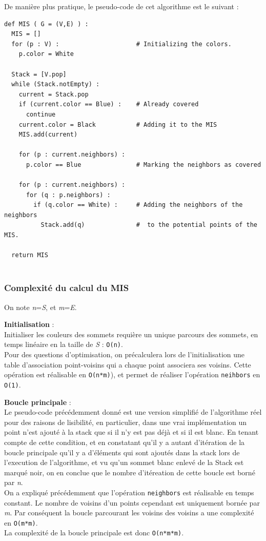 \documentclass[]{report}
\begin{document}
De manière plus pratique, le pseudo-code de cet algorithme est le
suivant :

\begin{lstlisting}
def MIS ( G = (V,E) ) :
  MIS = []
  for (p : V) :                     # Initializing the colors.
    p.color = White
  
  Stack = [V.pop]
  while (Stack.notEmpty) :
    current = Stack.pop
    if (current.color == Blue) :    # Already covered
      continue
    current.color = Black           # Adding it to the MIS
    MIS.add(current)
    
    for (p : current.neighbors) :
      p.color == Blue               # Marking the neighbors as covered
  
    for (p : current.neighbors) :
      for (q : p.neighbors) :
        if (q.color == White) :     # Adding the neighbors of the neighbors
          Stack.add(q)              #  to the potential points of the MIS.

  return MIS
  
\end{lstlisting}

\subsubsection{Complexité du calcul du
MIS}\label{complexituxe9-du-calcul-du-mis}

On note \emph{n}=\textbar{}\emph{S}\textbar{}, et
\emph{m}=\textbar{}\emph{E}\textbar{}.

\textbf{Initialisation} :\\
Initialiser les couleurs des sommets requière un unique parcours des
sommets, en temps linéaire en la taille de \emph{S} :
\lstinline!O(n)!.\\
Pour des questions d'optimisation, on précalculera lors de
l'initialisation une table d'association point-voisins qui a chaque
point associera ses voisins. Cette opération est réalisable en
\lstinline!O(n*m)!), et permet de réaliser l'opération
\lstinline!neihbors! en \lstinline!O(1)!.

\textbf{Boucle principale} :\\
Le pseudo-code précédemment donné est une version simplifié de
l'algorithme réel pour des raisons de lisibilité, en particulier, dans
une vrai implémentation un point n'est ajouté à la stack que si il n'y
est pas déjà et si il est blanc. En tenant compte de cette condition, et
en constatant qu'il y a autant d'itération de la boucle principale qu'il
y a d'éléments qui sont ajoutés dans la stack lors de l'execution de
l'algorithme, et vu qu'un sommet blanc enlevé de la Stack est marqué
noir, on en conclue que le nombre d'itéreation de cette boucle est borné
par \emph{n}.\\
On a expliqué précédemment que l'opération \lstinline!neighbors! est
réalisable en temps constant. Le nombre de voisins d'un points cependant
est uniquement bornée par \emph{m}. Par conséquent la boucle parcourant
les voisins des voisins a une complexité en \lstinline!O(m*m)!.\\
La complexité de la boucle principale est donc \lstinline!O(n*m*m)!.
\end{document}
